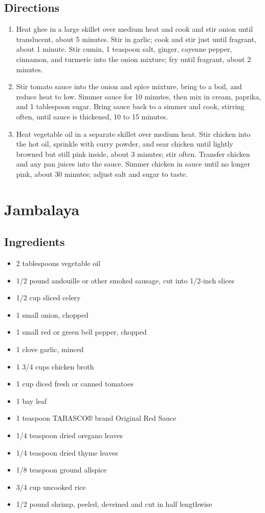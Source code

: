 \documentclass[oneside,11pt]{book}
\newcommand{\Ingredients}[1]{
    \subsection*{Ingredients}
    \begin{itemize} 
      #1 
    \end{itemize}
}
\newcommand{\Directions}[1]{
    \subsection*{Directions}
    \begin{enumerate} 
      #1 
    \end{enumerate}
}
\newcommand{\recipe}[1]{
    \section*{ \hspace{-12pt} #1 }
    \addcontentsline{toc}{section}{ \hspace{-6pt} #1 }
}
\begin{document}
        \Directions{
            \item Heat ghee in a large skillet over medium heat and cook and stir onion until translucent, about 5 minutes. 
                Stir in garlic; cook and stir just until fragrant, about 1 minute. 
                Stir cumin, 1 teaspoon salt, ginger, cayenne pepper, cinnamon, and turmeric into the onion mixture; 
                fry until fragrant, about 2 minutes.
            \item Stir tomato sauce into the onion and spice mixture, bring to a boil, and reduce heat to low.
                Simmer sauce for 10 minutes, then mix in cream, paprika, and 1 tablespoon sugar. 
                Bring sauce back to a simmer and cook, stirring often, until sauce is thickened, 10 to 15 minutes.
            \item Heat vegetable oil in a separate skillet over medium heat. 
                Stir chicken into the hot oil, sprinkle with curry powder, and sear chicken until lightly browned but still pink inside, about 3 minutes; stir often. 
                Transfer chicken and any pan juices into the sauce. 
                Simmer chicken in sauce until no longer pink, about 30 minutes; adjust salt and sugar to taste.
        }
		
	\recipe{Jambalaya}
	    \Ingredients{
			\item 2 tablespoons vegetable oil
			\item 1/2 pound andouille or other smoked sausage, cut into 1/2-inch slices
			\item 1/2 cup sliced celery
			\item 1 small onion, chopped
			\item 1 small red or green bell pepper, chopped
			\item 1 clove garlic, minced
			\item 1 3/4 cups chicken broth
			\item 1 cup diced fresh or canned tomatoes
			\item 1 bay leaf
			\item 1 teaspoon TABASCO® brand Original Red Sauce
			\item 1/4 teaspoon dried oregano leaves
			\item 1/4 teaspoon dried thyme leaves
			\item 1/8 teaspoon ground allspice
			\item 3/4 cup uncooked rice
			\item 1/2 pound shrimp, peeled, deveined and cut in half lengthwise
		}
		
\end{document}
